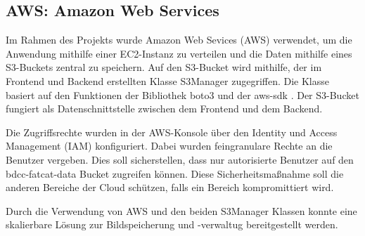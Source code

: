 \subsection{AWS: Amazon Web Services}
Im Rahmen des Projekts wurde Amazon Web Sevices (AWS) verwendet, um die Anwendung mithilfe einer EC2-Instanz zu verteilen und die Daten mithilfe eines S3-Buckets zentral zu speichern. Auf den
S3-Bucket wird mithilfe, der im Frontend und Backend erstellten Klasse \glqq S3Manager\grqq{} zugegriffen. Die Klasse basiert auf den Funktionen der Bibliothek boto3 \cite{boto3} und der aws-sdk \cite{awsSdk}. Der S3-Bucket fungiert als Datenschnittstelle zwischen dem Frontend und dem Backend. 

Die Zugriffsrechte wurden in der AWS-Konsole über den Identity und Access Management (IAM) konfiguriert. Dabei wurden feingranulare Rechte an die Benutzer 
vergeben. Dies soll sicherstellen, dass nur autorisierte Benutzer auf den \glqq bdcc-fatcat-data\grqq{} Bucket zugreifen können. Diese Sicherheitsmaßnahme soll die anderen Bereiche der Cloud schützen, falls ein Bereich kompromittiert wird.

Durch die Verwendung von AWS und den beiden S3Manager Klassen konnte eine skalierbare Lösung zur Bildspeicherung und -verwaltug bereitgestellt werden.